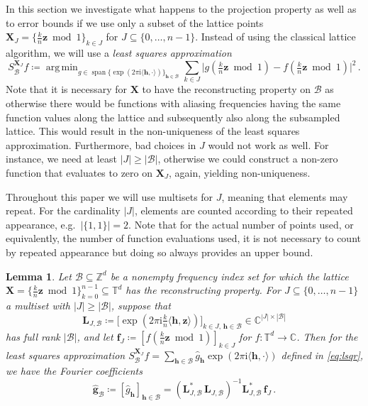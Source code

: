 \documentclass[a4paper]{amsart}
\newtheorem{lemma}[theorem]{Lemma}
\renewcommand{\hat}{\widehat}
\DeclareMathOperator{\Span}{span}
\DeclareMathOperator*{\Argmin}{arg\,min}
\newcommand{\modone}{\bmod{}1}
\begin{document}
In this section we investigate what happens to the projection property as well as to error bounds if we use only a subset of the lattice points $\bm X_J = \{\frac kn\bm z\modone\}_{k\in J}$ for $J\subseteq\{0,\dots,n-1\}$.
Instead of using the classical lattice algorithm, we will use a \emph{least squares approximation}
\begin{equation}\label{eq:lsqr}
    S_{\mathcal B}^{\bm X_J} f
    \coloneqq \Argmin_{g\in \Span\{\exp(2\pi\mathrm i\langle\bm h,\cdot\rangle)\}_{\bm h\in\mathcal B}} \sum_{k\in J} \Big| g(\tfrac kn\bm z\modone) - f(\tfrac kn\bm z\modone) \Big|^2 \,.
\end{equation}
Note that it is necessary for $\bm X$ to have the reconstructing property on $\mathcal B$ as otherwise there would be functions with aliasing frequencies having the same function values along the lattice and subsequently also along the subsampled lattice.
This would result in the non-uniqueness of the least squares approximation.
Furthermore, bad choices in $J$ would not work as well.
For instance, we need at least $|J|\ge|\mathcal B|$, otherwise we could construct a non-zero function that evaluates to zero on $\bm X_J$, again, yielding non-uniqueness.

Throughout this paper we will use multisets for $J$, meaning that elements may repeat.
For the cardinality $|J|$, elements are counted according to their repeated appearance, e.g.\ $|\{1, 1\}| = 2$.
Note that for the actual number of points used, or equivalently, the number of function evaluations used, it is not necessary to count by repeated appearance but doing so always provides an upper bound.

\begin{lemma}\label{lsqrcoeffs} Let $\mathcal B\subseteq\mathds Z^d$ be a nonempty frequency index set for which the lattice $\bm X = \{\frac kn\bm z\modone\}_{k=0}^{n-1} \subseteq\mathds T^d$ has the reconstructing property.
    For $J\subseteq\{0,\dots,n-1\}$ a multiset with $|J|\ge|\mathcal B|$, suppose that
    \begin{equation}\label{eq:L}
        \bm L_{J,\mathcal B}
        \coloneqq \Big[ \exp(2\pi\mathrm i\tfrac kn\langle\bm h, \bm z\rangle) \Big]_{k\in J,\, \bm h\in\mathcal B}
        \in\mathds C^{|J|\times|\mathcal B|}
    \end{equation}
    has full rank $|\mathcal B|$, and let $\bm f_{J} \coloneqq [f(\frac kn\bm z\modone)]_{k\in J}$ for $f\colon\mathds T^d\to\mathds C$.
    Then for the least squares approximation 
    $S_{\mathcal B}^{\bm X_J} f = \sum_{\bm h\in\mathcal B}\hat g_{\bm h} \exp(2\pi\mathrm i\langle\bm h,\cdot\rangle)$
    defined in \eqref{eq:lsqr}, we have the Fourier coefficients
    \begin{equation*}
        \bm{\hat g}_{\mathcal B}
        \coloneqq [\hat g_{\bm h}]_{\bm h\in\mathcal B}
        = (\bm L_{J,\mathcal B}^{\ast} \, \bm L_{J,\mathcal B})^{-1} \bm L_{J,\mathcal B}^{\ast} \, \bm f_J \,.
    \end{equation*}
\end{lemma} 
\end{document}
